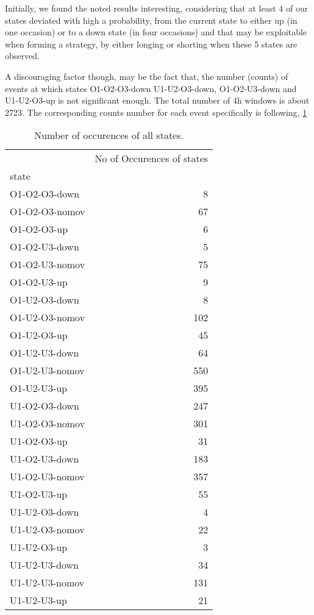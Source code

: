 Initially, we found the noted results interesting, considering that at least 4 of our states deviated with high a probability, from the current state to either up (in one occasion) or to a down state (in four occasions) and that may be exploitable when forming a strategy, by either longing or shorting when these 5 states are observed.

A discouraging factor though, may be the fact that, the number (counts) of events at which states O1-O2-O3-down U1-U2-O3-down, O1-O2-U3-down and U1-U2-O3-up is not significant enough. The total number of 4h windows is about 2723. The corresponding counts number for each event specifically is following, \ref{Tab: four_h_count}

\begin{table}[H]
\caption{Number of occurences of all states.}
\centering
\begin{tabular}{lr}
\toprule
{} &  No of Occurences of states \\
state          &        \\
\midrule
O1-O2-O3-down  &      8 \\
O1-O2-O3-nomov &     67 \\
O1-O2-O3-up    &      6 \\
O1-O2-U3-down  &      5 \\
O1-O2-U3-nomov &     75 \\
O1-O2-U3-up    &      9 \\
O1-U2-O3-down  &      8 \\
O1-U2-O3-nomov &    102 \\
O1-U2-O3-up    &     45 \\
O1-U2-U3-down  &     64 \\
O1-U2-U3-nomov &    550 \\
O1-U2-U3-up    &    395 \\
U1-O2-O3-down  &    247 \\
U1-O2-O3-nomov &    301 \\
U1-O2-O3-up    &     31 \\
U1-O2-U3-down  &    183 \\
U1-O2-U3-nomov &    357 \\
U1-O2-U3-up    &     55 \\
U1-U2-O3-down  &      4 \\
U1-U2-O3-nomov &     22 \\
U1-U2-O3-up    &      3 \\
U1-U2-U3-down  &     34 \\
U1-U2-U3-nomov &    131 \\
U1-U2-U3-up    &     21 \\
\bottomrule
\end{tabular}
\label{Tab: four_h_count}
\end{table}


